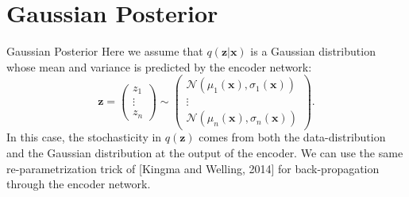 \documentclass{beamer}
\begin{document}
\section{Gaussian Posterior}

\begin{frame}{Gaussian Posterior}
  Here we assume that $q(\mathbf{z}|\mathbf{x})$ is a Gaussian distribution whose
  mean and variance is predicted by the encoder network:
  \begin{equation*}
    \mathbf{z} =  \begin{pmatrix} z_1 \\ \vdots \\ z_n \end{pmatrix}
    \sim \begin{pmatrix}  \mathcal{N}(\mu_1(\mathbf{x}), \sigma_1(\mathbf{x})) \\
    \vdots \\  \mathcal{N}(\mu_n(\mathbf{x}), \sigma_n(\mathbf{x})) \end{pmatrix}.
  \end{equation*}
  In this case, the stochasticity in $q(\mathbf{z})$ comes from both the data-distribution and
  the Gaussian distribution at the output of the encoder. We can use the same re-parametrization
  trick of [Kingma and Welling, 2014] for back-propagation through the encoder network.


\end{frame}

%
%
%
\end{document}
